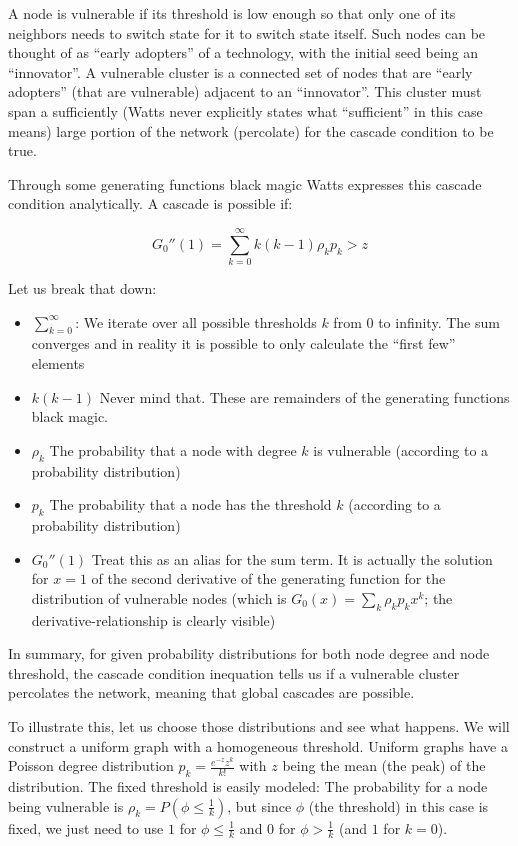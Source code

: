 \documentclass{sig-alternate-05-2015}
\begin{document}
A node is vulnerable if its threshold is low enough so that only one of its neighbors needs to switch state for it to switch state itself. Such nodes can be thought of as ``early adopters'' of a technology, with the initial seed being an ``innovator''. A vulnerable cluster is a connected set of nodes that are ``early adopters'' (that are vulnerable) adjacent to an ``innovator''. This cluster must span a sufficiently (Watts never explicitly states what ``sufficient'' in this case means) large portion of the network (percolate) for the cascade condition to be true.

Through some generating functions black magic Watts expresses this cascade condition analytically. A cascade is possible if:

\begin{equation}
  G_0''(1) = \sum_{k=0}^\infty k (k-1) \rho_k p_k > z
\end{equation}

Let us break that down:

\begin{itemize}
  \item $\sum_{k=0}^\infty$: We iterate over all possible thresholds $k$ from $0$ to infinity. The sum converges and in reality it is possible to only calculate the ``first few'' elements
  \item $k (k-1)$ Never mind that. These are remainders of the generating functions black magic.
  \item $\rho_k$ The probability that a node with degree $k$ is vulnerable (according to a probability distribution)
  \item $p_k$ The probability that a node has the threshold $k$ (according to a probability distribution)
  \item $G_0''(1)$ Treat this as an alias for the sum term. It is actually the solution for $x = 1$ of the second derivative of the generating function for the distribution of vulnerable nodes (which is $G_0(x) = \sum_k \rho_kp_kx^k$; the derivative-relationship is clearly visible)
\end{itemize}

In summary, for given probability distributions for both node degree and node threshold, the cascade condition inequation tells us if a vulnerable cluster percolates the network, meaning that global cascades are possible.

To illustrate this, let us choose those distributions and see what happens. We will construct a uniform graph with a homogeneous threshold. Uniform graphs have a Poisson degree distribution $p_k = \frac{e^{-z}z^k}{k!}$ with $z$ being the mean (the peak) of the distribution. The fixed threshold is easily modeled: The probability for a node being vulnerable is $\rho_k = P(\phi \leq \frac{1}{k})$, but since $\phi$ (the threshold) in this case is fixed, we just need to use $1$ for $\phi \leq \frac{1}{k}$ and $0$ for $\phi > \frac{1}{k}$ (and $1$ for $k = 0$).
\end{document}
